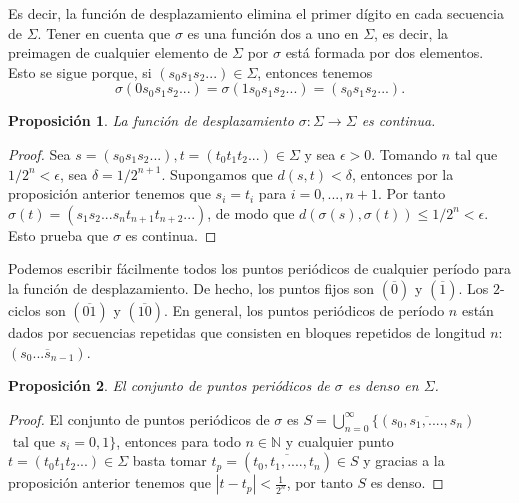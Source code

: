 \documentclass[12pt,a4paper]{report}
\newtheorem{proposicion}{Proposición}[section]
\theoremstyle{definition}
\begin{document}
Es decir, la función de desplazamiento elimina el primer dígito en cada secuencia de \(\Sigma\). Tener en cuenta que \(\sigma\) es una función dos a uno en \(\Sigma\), es decir, la preimagen de cualquier elemento de \(\Sigma\) por \(\sigma\) está formada por dos elementos. Esto se sigue porque, si \((s_{0}s_{1}s_{2}...)\in\Sigma\), entonces tenemos
\[
\sigma(0s_{0}s_{1}s_{2}...)=\sigma(1s_{0}s_{1}s_{2}...)=(s_{0}s_{1}s_{2}...).
\]
%



\begin{proposicion}

La función de desplazamiento 
\(\sigma:\Sigma\rightarrow\Sigma\) es continua.

\end{proposicion}

\begin{proof}

Sea \(s=(s_{0}s_{1}s_{2}...), t=(t_{0}t_{1}t_{2}...)\in\Sigma\) y sea \(\epsilon>0\). Tomando \(n\) tal que \(1/2^{n}<\epsilon\), sea \(\delta=1/2^{n+1}\). Supongamos que \(d(s,t)<\delta\), entonces por la proposición anterior tenemos que \(s_{i}=t_{i}\) para \(i=0,...,n+1\). Por tanto \(\sigma(t)=(s_{1}s_{2}...s_{n}t_{n+1}t_{n+2}...)\), de modo que \(d(\sigma(s),\sigma(t))\le1/2^{n}<\epsilon\). Esto prueba que \(\sigma\) es continua.

\end{proof} 

Podemos escribir fácilmente todos los puntos periódicos de cualquier período para la función de desplazamiento. De hecho, los puntos fijos son \((\overline{0})\) y \((\overline{1})\). Los $2$-ciclos son \((\overline{01})\) y  \((\overline{10})\). En general, los puntos periódicos de período \(n\) están dados por secuencias repetidas que consisten en bloques repetidos de longitud \(n\): \((\overline{s_{0}...s_{n-1}})\).

\begin{proposicion}

El conjunto de puntos periódicos de $\sigma$ es denso en $\Sigma$.

\end{proposicion}

\begin{proof}

El conjunto de puntos periódicos de $\sigma$ es $S = \bigcup_{n=0}^\infty \{ (\overline{s_0,s_1,....,s_n}) $ $\text{ tal que } s_i = 0,1\}$, entonces para todo $n \in \mathbb{N}$ y
cualquier punto \(t=(t_{0}t_{1}t_{2}...) \in \Sigma\) basta tomar $t_p = (\overline{t_0,t_1,....,t_n}) \in S$ y gracias a la proposición anterior tenemos que $|t - t_p|< \frac{1}{2^n}$, por tanto $S$ es denso.
    
\end{proof}
\end{document}
